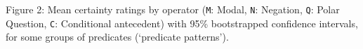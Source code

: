 \documentclass[12pt, a4paper]{article}
\begin{document}
{\vspace{-.4\baselineskip}
\noindent \normalsize Figure 2: \small Mean certainty ratings by operator (\texttt{M}: Modal, \texttt{N}: Negation, \texttt{Q}: Polar Question, \texttt{C}: Conditional antecedent) with 95\% bootstrapped confidence intervals, for some groups of predicates (\lq predicate patterns\rq).

	

\newpage


}
\end{document}
